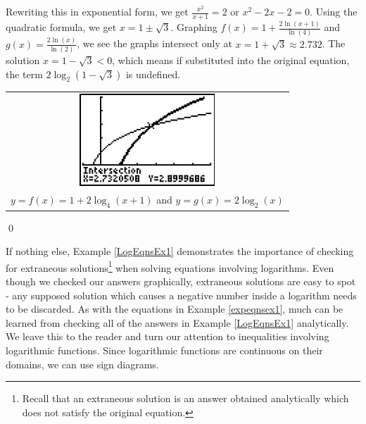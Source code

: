 \begin{ex}
\begin{enumerate}
Rewriting this in exponential form, we get $ \frac{x^{2}}{x+1} = 2$ or $x^2 -2x-2 = 0$.  Using the quadratic formula, we get $x = 1 \pm \sqrt{3}$.  Graphing $f(x) = 1 + \frac{2\ln(x+1)}{\ln(4)}$ and $g(x) = \frac{2 \ln(x)}{\ln(2)}$, we see the graphs intersect only at $x = 1 + \sqrt{3} \approx 2.732$.  The solution $x = 1 - \sqrt{3} < 0$, which means if substituted into the original equation, the term $2 \log_{2}\left(1 - \sqrt{3}\right)$ is undefined.

\begin{center}
\begin{tabular}{c}

\includegraphics[width=2in]{./ExpLogsGraphics/LogEqns07.jpg} \\

$y = f(x) = 1 + 2 \log_{4}(x+1)$ and \boldmath $y = g(x) = 2 \log_{2}(x)$ \\

\end{tabular}
\end{center}
\end{enumerate}

\qed
\end{ex}

If nothing else,  Example \ref{LogEqnsEx1} demonstrates the importance of checking for extraneous solutions\footnote{Recall that an extraneous solution is an answer obtained analytically which does not satisfy the original equation.} when solving equations involving logarithms.  Even though we checked our answers graphically, extraneous solutions are easy to spot - any supposed solution which causes a negative number inside a logarithm needs to be discarded.  As with the equations in Example \ref{expeqnsex1}, much can be learned from checking all of the answers in Example \ref{LogEqnsEx1} analytically.  We leave this to the reader and turn our attention to inequalities involving logarithmic functions.  Since logarithmic functions are continuous on their domains, we can use sign diagrams.  

